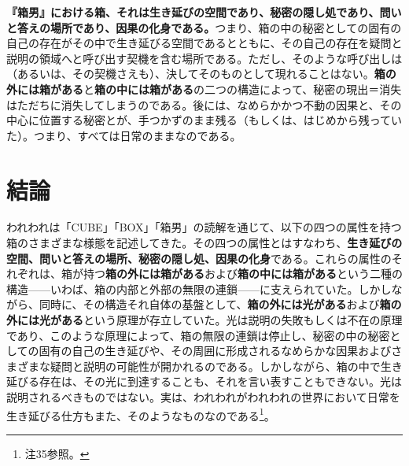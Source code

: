 \documentclass[a4paper]{jsarticle}
\begin{document}
\textbf{『箱男』における箱、それは生き延びの空間であり、秘密の隠し処であり、問いと答えの場所であり、因果の化身である。}つまり、箱の中の秘密としての固有の自己の存在がその中で生き延びる空間であるとともに、その自己の存在を疑問と説明の領域へと呼び出す契機を含む場所である。ただし、そのような呼び出しは（あるいは、その契機さえも）、決してそのものとして現れることはない。\textbf{箱の外には箱がある}と\textbf{箱の中には箱がある}の二つの構造によって、秘密の現出＝消失はただちに消失してしまうのである。後には、なめらかかつ不動の因果と、その中心に位置する秘密とが、手つかずのまま残る（もしくは、はじめから残っていた）。つまり、すべては日常のままなのである。

\section{結論}

われわれは「CUBE」「BOX」「箱男」の読解を通じて、以下の四つの属性を持つ箱のさまざまな様態を記述してきた。その四つの属性とはすなわち、\textbf{生き延びの空間、問いと答えの場所、秘密の隠し処、因果の化身}である。これらの属性のそれぞれは、箱が持つ\textbf{箱の外には箱がある}および\textbf{箱の中には箱がある}という二種の構造------いわば、箱の内部と外部の無限の連鎖------に支えられていた。しかしながら、同時に、その構造それ自体の基盤として、\textbf{箱の外には光がある}および\textbf{箱の外には光がある}という原理が存立していた。光は説明の失敗もしくは不在の原理であり、このような原理によって、箱の無限の連鎖は停止し、秘密の中の秘密としての固有の自己の生き延びや、その周囲に形成されるなめらかな因果およびさまざまな疑問と説明の可能性が開かれるのである。しかしながら、箱の中で生き延びる存在は、その光に到達することも、それを言い表すこともできない。光は説明されるべきものではない。実は、われわれがわれわれの世界において日常を生き延びる仕方もまた、そのようなものなのである\footnote{注35参照。}。
\end{document}
